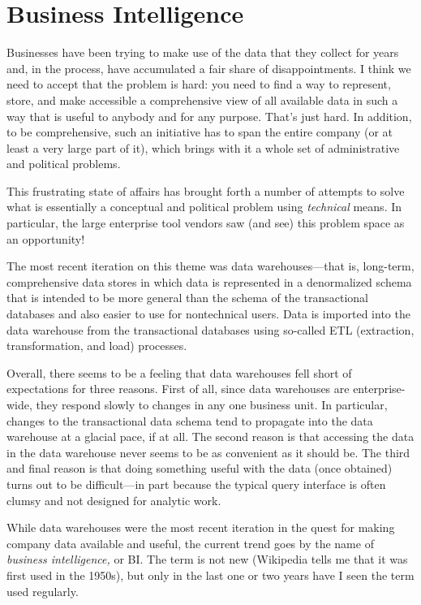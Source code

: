 \section{Business Intelligence}

    
Businesses have been trying to make use of the data that they collect
for years and, in the process, have accumulated a fair share of
disappointments. I think we need to accept that the problem is
hard: you need to find a way to represent, store, and make accessible
a comprehensive view of all available data in such a way that is
useful to anybody and for any purpose. That's just hard. In addition,
to be comprehensive, such an initiative has to span the entire company
(or at least a very large part of it), which brings with it a whole
set of administrative and political problems.
 
This frustrating state of affairs has brought forth a number of
attempts to solve what is essentially a conceptual and political
problem using \emph{technical} means. In particular, the large
enterprise tool vendors saw (and see) this problem space as an
opportunity!
   
The most recent iteration on this theme was data warehouses---that is,
long-term, comprehensive data stores in which data is represented in a
denormalized schema that is intended to be more general than the
schema of the transactional databases and also easier to use for
nontechnical users. Data is imported into the data warehouse from the
transactional databases using so-called ETL (extraction,
transformation, and load) processes.
    
Overall, there seems to be a feeling that data warehouses  fell short
of expectations for three reasons. First of all, since data warehouses
are enterprise-wide, they respond slowly to changes in any one
business unit. In particular, changes to the transactional data schema
tend to propagate into the data warehouse at a glacial pace, if at
all. The second reason is that accessing the data in the data
warehouse never seems to be as convenient as it should be. The third
and final reason is that doing something useful with the data (once
obtained) turns out to be difficult---in part because the typical
query interface is often clumsy and not designed for analytic work.
   
While data warehouses were the most recent iteration in the quest for
making company data available and useful, the current trend goes
by the name of \emph{business intelligence,} or BI. The term is
not new (Wikipedia tells me that it was first used in the 1950s),
but only in the last one or two years have I seen the term used
regularly.
    
